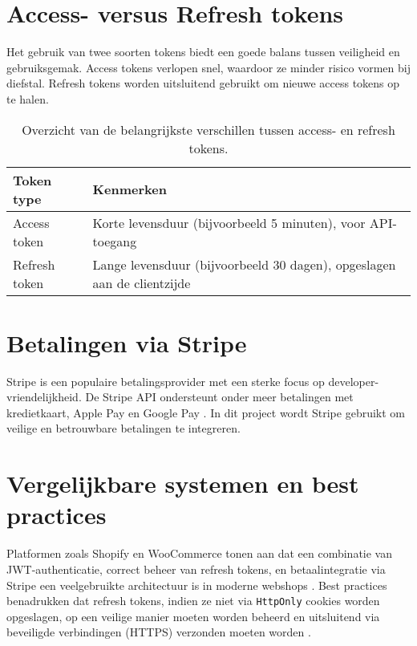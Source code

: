 \section{Access- versus Refresh tokens}

Het gebruik van twee soorten tokens biedt een goede balans tussen veiligheid en gebruiksgemak. Access tokens verlopen snel, waardoor ze minder risico vormen bij diefstal. Refresh tokens worden uitsluitend gebruikt om nieuwe access tokens op te halen.

\begin{table}[h]
\centering
\begin{tabular}{l l}
\toprule
\textbf{Token type} & \textbf{Kenmerken} \\
\midrule
Access token & Korte levensduur (bijvoorbeeld 5 minuten), voor API-toegang \\
Refresh token & Lange levensduur (bijvoorbeeld 30 dagen), opgeslagen aan de clientzijde \\
\bottomrule
\end{tabular}
\caption[Verschillen tussen access en refresh tokens.]{Overzicht van de belangrijkste verschillen tussen access- en refresh tokens.}
\end{table}


\section{Betalingen via Stripe}

Stripe is een populaire betalingsprovider met een sterke focus op developer-vriendelijkheid. De Stripe API ondersteunt onder meer betalingen met kredietkaart, Apple Pay en Google Pay \autocite{StripeDocs2024}. In dit project wordt Stripe gebruikt om veilige en betrouwbare betalingen te integreren.



\section{Vergelijkbare systemen en best practices}

Platformen zoals Shopify en WooCommerce tonen aan dat een combinatie van JWT-authenticatie, correct beheer van refresh tokens, en betaalintegratie via Stripe een veelgebruikte architectuur is in moderne webshops \autocite{BaeldungJWT,StripeDocs2024}. Best practices benadrukken dat refresh tokens, indien ze niet via \texttt{HttpOnly} cookies worden opgeslagen, op een veilige manier moeten worden beheerd en uitsluitend via beveiligde verbindingen (HTTPS) verzonden moeten worden \autocite{OWASP2021}.